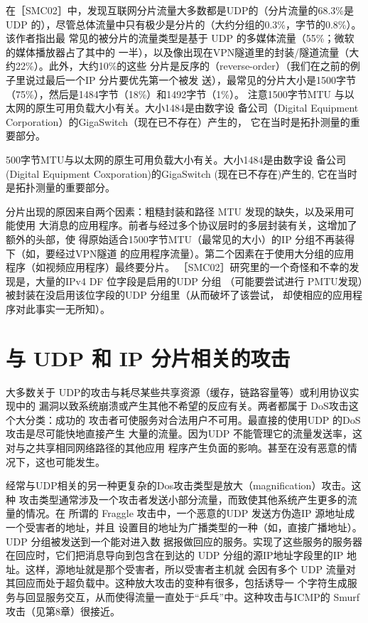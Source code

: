 在［SMC02］中，发现互联网分片流量大多数都是UDP的（分片流量的68.3\%是UDP
的），尽管总体流量中只有极少是分片的（大约分组的0.3\%，字节的0.8\%）。该作者指出最
常见的被分片的流量类型是基于 UDP 的多媒体流量（55\%；微软的媒体播放器占了其中的
一半），以及像出现在VPN隧道里的封装/隧道流量（大约22\%）。此外，大约10\%的这些
分片是反序的（reverse-order）（我们在之前的例子里说过最后一个IP 分片要优先第一个被发
送），最常见的分片大小是1500字节（75\%），然后是1484字节（18\%）和1492字节（1\%）。
注意1500字节MTU 与以太网的原生可用负载大小有关。大小1484是由数字设
备公司（Digital Equipment Corporation）的GigaSwitch（现在已不存在）产生的，
它在当时是拓扑测量的重要部分。

\begin{tcolorbox}
    500字节MTU与以太网的原生可用负载大小有关。大小1484是由数字设
    备公司(Digital Equipment Coxporation)的GigaSwitch (现在已不存在)产生的,
    它在当时是拓扑测量的重要部分。
\end{tcolorbox}

分片出现的原因来自两个因素：粗糙封装和路径 MTU 发现的缺失，以及采用可能使用
大消息的应用程序。前者与经过多个协议层时的多层封装有关，这增加了额外的头部，使
得原始适合1500字节MTU（最常见的大小）的IP 分组不再装得下（如，要经过VPN隧道
的应用程序流量）。第二个因素在于使用大分组的应用程序（如视频应用程序）最终要分片。
［SMC02］研究里的一个奇怪和不幸的发现是，大量的IPv4 DF 位字段是启用的UDP 分组
（可能要尝试进行 PMTU发现）被封装在没启用该位字段的UDP 分组里（从而破坏了该尝试，
却使相应的应用程序对此事实一无所知）。

\section{与 UDP 和 IP 分片相关的攻击}
大多数关于 UDP的攻击与耗尽某些共享资源（缓存，链路容量等）或利用协议实现中的
漏洞以致系统崩溃或产生其他不希望的反应有关。两者都属于 DoS攻击这个大分类：成功的
攻击者可使服务对合法用户不可用。最直接的使用UDP 的DoS攻击是尽可能快地直接产生
大量的流量。因为UDP 不能管理它的流量发送率，这对与之共享相同网络路径的其他应用
程序产生负面的影响。甚至在没有恶意的情况下，这也可能发生。

经常与UDP相关的另一种更复杂的Dos攻击类型是放大（magnification）攻击。这种
攻击类型通常涉及一个攻击者发送小部分流量，而致使其他系统产生更多的流量的情况。在
所谓的 Fraggle 攻击中，一个恶意的UDP 发送方伪造IP 源地址成一个受害者的地址，并且
设置目的地址为广播类型的一种（如，直接广播地址）。UDP 分组被发送到一个能对进入数
据报做回应的服务。实现了这些服务的服务器在回应时，它们把消息导向到包含在到达的
UDP 分组的源IP地址字段里的IP 地址。这样，源地址就是那个受害者，所以受害者主机就
会因有多个 UDP 流量对其回应而处于超负载中。这种放大攻击的变种有很多，包括诱导一
个字符生成服务与回显服务交互，从而使得流量一直处于“乒乓”中。这种攻击与ICMP的
Smurf 攻击（见第8章）很接近。

